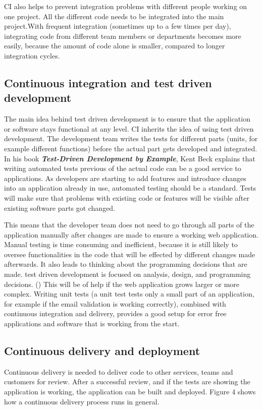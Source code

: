 CI also helps to prevent integration problems with different people working on one project. All the different code needs to be integrated into the main project.With frequent integration (sometimes up to a few times per day), integrating code from different team members or departments becomes more easily,
because the amount of code alone is smaller, compared to longer integration cycles.


\subsection{Continuous integration and test driven development}
The main idea behind test driven development is to ensure that the application or software stays functional at any level.
CI inherits the idea of using test driven development. The development team writes the tests for different parts (units, for example different functions)
before the actual part gets developed and integrated. In his book \textbf{\textit{Test-Driven Development by Example}}, Kent Beck explains that writing automated tests previous of the actual code can be a good service to applications. As developers are starting to add features and introduce changes into an application already in use, automated testing should be a standard. Tests will make sure that problems with existing code or features will be visible after existing software parts got changed. 

This means that the developer team does not need to go through all parts of the application manually after changes are made to ensure a working web application. Manual testing is time consuming and inefficient, because it is still likely to oversee functionalities in the code that will be effected by different changes made afterwards. It also leads to thinking about the programming decisions that are made. test driven development is focused on analysis, design, and programming decisions. (\cite{janzen2005test}) This will be of help if the web application grows larger or more complex. Writing unit tests (a unit test tests only a small part of an application, for example if the email validation is working correctly), combined with continuous integration and delivery, provides a good setup for error free applications and software that is working from the start.

\subsection{Continuous delivery and deployment}
Continuous delivery is needed to deliver code to other services, teams and customers for review. After a successful review, and if the tests are showing the application is working, the application can be built and deployed. Figure 4 shows how a continuous delivery process runs in general.

